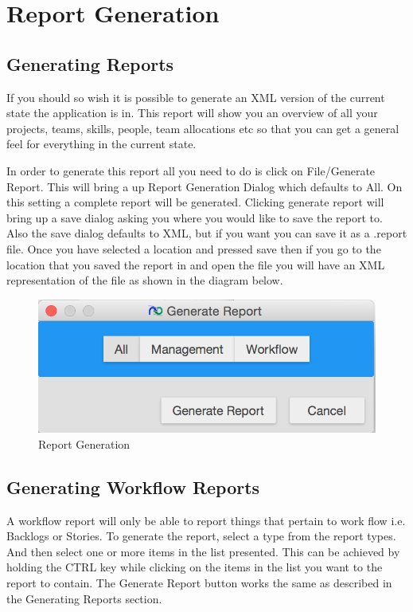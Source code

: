\section{Report Generation}

\subsection{Generating Reports}

If you should so wish it is possible to generate an XML version of the current state the application is in. This report will show you an overview of all your projects, teams, skills, people, team allocations etc so that you can get a general feel for everything in the current state.

In order to generate this report all you need to do is click on File/Generate Report. This will bring a up Report Generation Dialog which defaults to All. On this setting a complete report will be generated. Clicking generate report will bring up a save dialog asking you where you would like to save the report to. Also the save dialog defaults to XML, but if you want you can save it as a .report file. Once you have selected a location and pressed save then if you go to the location that you saved the report in and open the file you will have an XML representation of the file as shown in the diagram below.

\begin{figure}[H]
\centering
\includegraphics[width=\textwidth]{images/screenshots/report1.PNG}
\caption{Report Generation}
\label{fig:generate_report_all}
\end{figure}

\subsection{Generating Workflow Reports}

A workflow report will only be able to report things that pertain to work flow i.e. Backlogs or Stories. To generate the report, select a type from the report types. And then select one or more items in the list presented. This can be achieved by holding the CTRL key while clicking on the items in the list you want to the report to contain. The Generate Report button works the same as described in the Generating Reports section.

